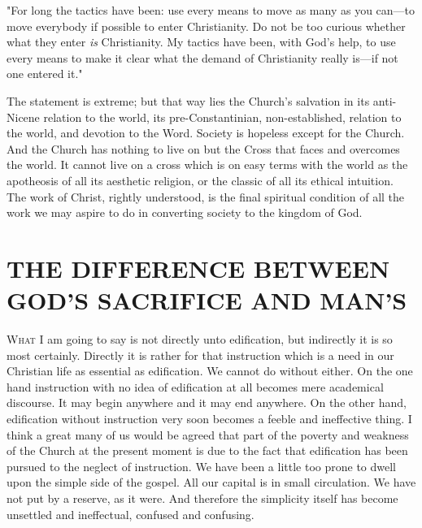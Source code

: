\documentclass[12pt,letterpaper,oneside]{book}
\begin{document}
"For long the tactics have been: use every 
means to move as many as you can---to move 
everybody if possible to enter Christianity. 
Do not be too curious whether what they enter 
\textit{is} Christianity. My tactics have been, with 
God's help, to use every means to make it clear 
what the demand of Christianity really is---if 
not one entered it." 

The statement is extreme; but that way lies 
the Church's salvation in its anti-Nicene relation 
to the world, its pre-Constantinian, non-established, relation to the world, and devotion 
to the Word. Society is hopeless except for the 
Church. And the Church has nothing to live on 
but the Cross that faces and overcomes the 
world. It cannot live on a cross which is on 
easy terms with the world as the apotheosis of 
all its aesthetic religion, or the classic of all its 
ethical intuition. The work of Christ, rightly 
understood, is the final spiritual condition of all 
the work we may aspire to do in converting 
society to the kingdom of God. 



\tableofcontents

\chapter{THE DIFFERENCE BETWEEN 
GOD'S SACRIFICE AND MAN'S} 






\textsc{What} I am going to say is not directly unto 
edification, but indirectly it is so most 
certainly. Directly it is rather for that instruction 
which is a need in our Christian life as 
essential as edification. We cannot do without 
either. On the one hand instruction with no idea 
of edification at all becomes mere academical 
discourse. It may begin anywhere and it may 
end anywhere. On the other hand, edification 
without instruction very soon becomes a feeble 
and ineffective thing. I think a great many of 
us would be agreed that part of the poverty 
and weakness of the Church at the present 
moment is due to the fact that edification has 
been pursued to the neglect of instruction. We 
have been a little too prone to dwell upon the 
simple side of the gospel. All our capital is in
small circulation. We have not put by a reserve, 
as it were. And therefore the simplicity 
itself has become unsettled and ineffectual, confused 
and confusing. 
\end{document}
